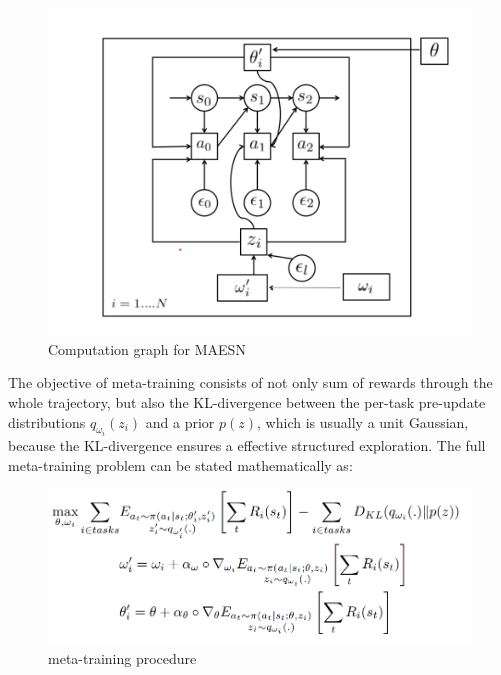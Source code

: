 \begin{figure}[H]
	\includegraphics[scale=0.7]{MAESN_02.PNG}
	\centering
	\caption{Computation graph for MAESN}
	\label{MAESN}
\end{figure}

The objective of meta-training consists of not only sum of rewards through the whole trajectory, but also the KL-divergence between the per-task pre-update distributions $q_{\omega_{i}}\left(z_{i}\right)$ and a prior $p(z)$, which is usually a unit Gaussian, because the KL-divergence ensures a effective structured exploration.
The full meta-training problem can be stated mathematically as:

\begin{figure}[H]
	\includegraphics[scale=0.48]{MAESN_03.PNG}
	\centering
	\caption{meta-training procedure}
	\label{MAESN}
\end{figure}













